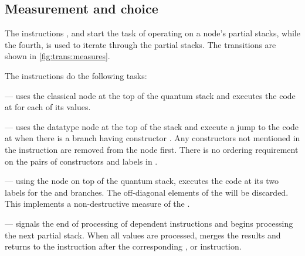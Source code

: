 \subsection{Measurement and choice}\label{subsec:measurementandchoice}
The instructions
,  and  start the task of 
operating on a node's partial stacks, while the fourth,  
is used to iterate through the partial stacks. The transitions are shown in 
\vref{fig:trans:measures}.

The instructions do the following tasks:
\begin{description}
\item{} --- uses the classical node at the top
of the quantum stack and executes the code at  for
each of its values.
\item{} --- uses the
datatype node at the top of the stack and
execute a jump to the code 
at  when there is a branch having constructor
. Any constructors not mentioned in the instruction 
are removed from the node first. There is no ordering 
requirement on the pairs of constructors and labels in .
\item{} --- using the
\qbit{} node on top of the quantum stack, executes
 the code at its two labels for 
 the  and  branches. 
The off-diagonal elements  of the \qbit{} will be
discarded. This implements a 
non-destructive measure of the \qbit.
\item{} --- signals the end of processing of dependent 
instructions and begins processing the next partial stack.
 When all values are processed, merges the results and returns
to the instruction after the corresponding , 
or  instruction.
\end{description}

